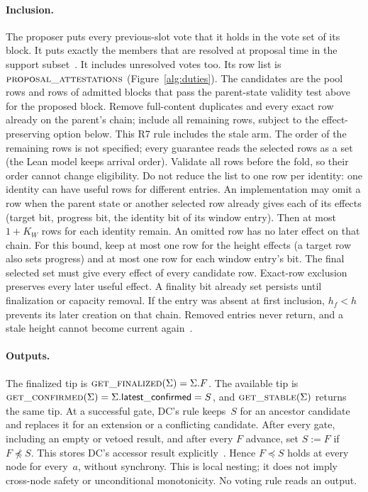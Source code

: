 \documentclass{article}
\theoremstyle{plain}
\theoremstyle{definition}
\theoremstyle{remark}
\newcommand{\fname}[1]{\text{\textsc{#1}}}
\newcommand{\latestConfirmed}{\mathsf{latest\_confirmed}}
\newcommand{\SAS}{\cite{SAS}}
\begin{document}
\paragraph{Inclusion.}  The proposer puts every previous-slot vote
that it holds in the vote set of its block.  It puts exactly the
members that are resolved at proposal time in the support
subset~\SAS.  It includes unresolved votes too.  Its row list is
$\Call{proposal\_attestations}{}$ (Figure~\ref{alg:duties}).  The candidates are
the pool rows and rows of admitted blocks that pass the parent-state
validity test above for the proposed block.  Remove full-content duplicates
and every exact row already on the parent's chain; include all remaining rows,
subject to the effect-preserving option below.
This R7 rule includes the stale arm.  The order of the remaining rows is not specified; every guarantee reads the selected rows as a set (the Lean model keeps arrival order).
Validate all rows before the fold, so their order cannot
change eligibility.  Do not reduce the list to one row per identity:
one identity can have useful rows for different entries.
An implementation may omit a row when the parent state or another
selected row already gives each of its effects (target bit, progress
bit, the identity bit of its window entry).  Then at most $1+K_W$ rows
for each identity remain.  An omitted row has no later effect on that chain.
For this bound, keep at most one row for the height effects (a target row
also sets progress) and at most one row for each window entry's bit.
The final selected set must give every effect of every candidate row.
Exact-row exclusion preserves every later useful effect.  A finality bit
already set persists until finalization or capacity removal.  If the
entry was absent at first inclusion, $h_f<h$ prevents its later creation
on that chain.  Removed entries never return, and a stale height cannot
become current again~\cite[\S2]{FW}.

\paragraph{Outputs.}  The finalized tip is
$\Call{get\_finalized}{\Sigma}=\Sigma.F$.  The available tip is
$\Call{get\_confirmed}{\Sigma}=\Sigma.\latestConfirmed=S$, and
$\Call{get\_stable}{\Sigma}$ returns the same tip.  At a successful
gate, DC's \fname{advance} rule keeps~$S$ for an ancestor candidate and
replaces it for an extension or a conflicting candidate.  After every
gate, including an empty or vetoed result, and after every $F$ advance,
set $S:=F$ if $F\not\preceq S$.  This stores DC's \fname{get\_stable}
accessor result explicitly~\cite[\S\S2,7]{FB}.  Hence $F\preceq S$
holds at every node for every~$a$, without synchrony.  This is local
nesting; it does not imply cross-node safety or unconditional monotonicity.
No voting rule reads an output.
\end{document}
